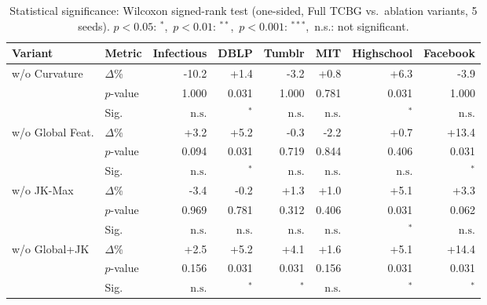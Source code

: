 \begin{table}[t]
\centering
\caption{Statistical significance: Wilcoxon signed-rank test (one-sided, Full TCBG vs.\ ablation variants, 5 seeds). $p{<}0.05$: $^*$,\ $p{<}0.01$: $^{**}$,\ $p{<}0.001$: $^{***}$,\ n.s.: not significant.}
\label{tab:significance}
\small
\setlength{\tabcolsep}{4pt}
\begin{tabular}{llrrrrrr}
\toprule
\textbf{Variant} & \textbf{Metric} & \textbf{Infectious} & \textbf{DBLP} & \textbf{Tumblr} & \textbf{MIT} & \textbf{Highschool} & \textbf{Facebook} \\
\midrule
w/o Curvature & $\Delta$\% & -10.2 & +1.4 & -3.2 & +0.8 & +6.3 & -3.9 \\
 & $p$-value & 1.000 & 0.031 & 1.000 & 0.781 & 0.031 & 1.000 \\
 & Sig. & $\text{n.s.}$ & $^{*}$ & $\text{n.s.}$ & $\text{n.s.}$ & $^{*}$ & $\text{n.s.}$ \\
\midrule
w/o Global Feat. & $\Delta$\% & +3.2 & +5.2 & -0.3 & -2.2 & +0.7 & +13.4 \\
 & $p$-value & 0.094 & 0.031 & 0.719 & 0.844 & 0.406 & 0.031 \\
 & Sig. & $\text{n.s.}$ & $^{*}$ & $\text{n.s.}$ & $\text{n.s.}$ & $\text{n.s.}$ & $^{*}$ \\
\midrule
w/o JK-Max & $\Delta$\% & -3.4 & -0.2 & +1.3 & +1.0 & +5.1 & +3.3 \\
 & $p$-value & 0.969 & 0.781 & 0.312 & 0.406 & 0.031 & 0.062 \\
 & Sig. & $\text{n.s.}$ & $\text{n.s.}$ & $\text{n.s.}$ & $\text{n.s.}$ & $^{*}$ & $\text{n.s.}$ \\
\midrule
w/o Global+JK & $\Delta$\% & +2.5 & +5.2 & +4.1 & +1.6 & +5.1 & +14.4 \\
 & $p$-value & 0.156 & 0.031 & 0.031 & 0.156 & 0.031 & 0.031 \\
 & Sig. & $\text{n.s.}$ & $^{*}$ & $^{*}$ & $\text{n.s.}$ & $^{*}$ & $^{*}$ \\
\bottomrule
\end{tabular}
\end{table}